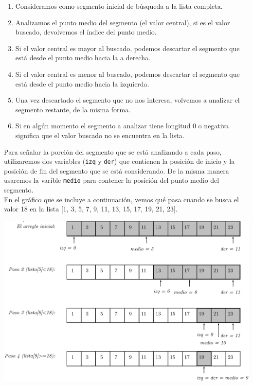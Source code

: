 \begin{enumerate}
\item Consideramos como segmento inicial de búsqueda a la lista completa.

\item Analizamos el punto medio del segmento (el valor central), si es el valor
buscado, devolvemos el índice del punto medio.

\item Si el valor central es mayor al buscado, podemos descartar el segmento
que está desde el punto medio hacia la a derecha.

\item Si el valor central es menor al buscado, podemos descartar el segmento
que está desde el punto medio hacia la izquierda.

\item Una vez descartado el segmento que no nos interesa, volvemos a analizar
el segmento restante, de la misma forma.

\item Si en algún momento el segmento a analizar tiene longitud 0 o negativa
significa que el valor buscado no se encuentra en la lista.
\end{enumerate}

Para señalar la porción del segmento que se está analizando a cada paso,
utilizaremos dos variables (\lstinline!izq! y \lstinline!der!) que
contienen la posición de inicio y la posición de fin del segmento que se
está considerando. De la misma manera usaremos la varible \lstinline!medio!
para contener la posición del punto medio del segmento. \\

En el gráfico que se incluye a continuación, vemos qué pasa cuando se busca
el valor 18 en la lista [1, 3, 5, 7, 9, 11, 13, 15, 17, 19, 21, 23].

{\centering
\includegraphics{graficos/uni8-seguimiento}
}

